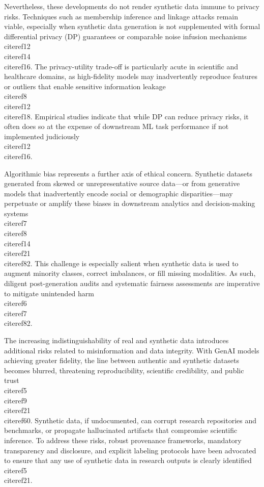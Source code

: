 \documentclass[11pt]{article}
\begin{document}
Nevertheless, these developments do not render synthetic data immune to privacy risks. Techniques such as membership inference and linkage attacks remain viable, especially when synthetic data generation is not supplemented with formal differential privacy (DP) guarantees or comparable noise infusion mechanisms \\cite{ref12}\\cite{ref14}\\cite{ref16}. The privacy-utility trade-off is particularly acute in scientific and healthcare domains, as high-fidelity models may inadvertently reproduce features or outliers that enable sensitive information leakage \\cite{ref8}\\cite{ref12}\\cite{ref18}. Empirical studies indicate that while DP can reduce privacy risks, it often does so at the expense of downstream ML task performance if not implemented judiciously \\cite{ref12}\\cite{ref16}.

Algorithmic bias represents a further axis of ethical concern. Synthetic datasets generated from skewed or unrepresentative source data—or from generative models that inadvertently encode social or demographic disparities—may perpetuate or amplify these biases in downstream analytics and decision-making systems \\cite{ref7}\\cite{ref8}\\cite{ref14}\\cite{ref21}\\cite{ref82}. This challenge is especially salient when synthetic data is used to augment minority classes, correct imbalances, or fill missing modalities. As such, diligent post-generation audits and systematic fairness assessments are imperative to mitigate unintended harm \\cite{ref6}\\cite{ref7}\\cite{ref82}.

The increasing indistinguishability of real and synthetic data introduces additional risks related to misinformation and data integrity. With GenAI models achieving greater fidelity, the line between authentic and synthetic datasets becomes blurred, threatening reproducibility, scientific credibility, and public trust \\cite{ref5}\\cite{ref9}\\cite{ref21}\\cite{ref60}. Synthetic data, if undocumented, can corrupt research repositories and benchmarks, or propagate hallucinated artifacts that compromise scientific inference. To address these risks, robust provenance frameworks, mandatory transparency and disclosure, and explicit labeling protocols have been advocated to ensure that any use of synthetic data in research outputs is clearly identified \\cite{ref5}\\cite{ref21}.
\end{document}
